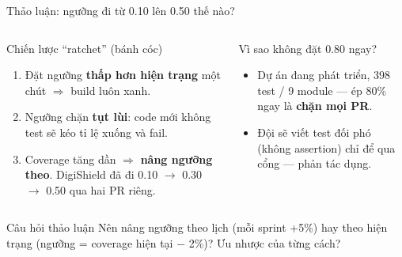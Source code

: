 \documentclass[aspectratio=169,12pt]{beamer}
\begin{document}
\begin{frame}{Thảo luận: ngưỡng đi từ 0.10 lên 0.50 thế nào?}
  \begin{columns}[T]
    \begin{block}{Chiến lược ``ratchet'' (bánh cóc)}
      \begin{enumerate}
        \item Đặt ngưỡng \textbf{thấp hơn hiện trạng} một chút
              $\Rightarrow$ build luôn xanh.
        \item Ngưỡng chặn \textbf{tụt lùi}: code mới không test
              sẽ kéo tỉ lệ xuống và fail.
        \item Coverage tăng dần $\Rightarrow$ \textbf{nâng ngưỡng theo}.
              DigiShield đã đi 0.10 $\to$ 0.30 $\to$ 0.50
              qua hai PR riêng.
      \end{enumerate}
    \end{block}

    \begin{alertblock}{Vì sao không đặt 0.80 ngay?}
      \begin{itemize}
        \item Dự án đang phát triển, 398 test / 9 module ---
              ép 80\% ngay là \textbf{chặn mọi PR}.
        \item Đội sẽ viết test đối phó (không assertion)
              chỉ để qua cổng --- phản tác dụng.
      \end{itemize}
    \end{alertblock}
  \end{columns}

  \vspace{0.1em}
  \begin{exampleblock}{Câu hỏi thảo luận}
    \small Nên nâng ngưỡng theo lịch (mỗi sprint +5\%) hay theo hiện trạng
    (ngưỡng = coverage hiện tại $-$ 2\%)? Ưu nhược của từng cách?
  \end{exampleblock}
\end{frame}
\end{document}
